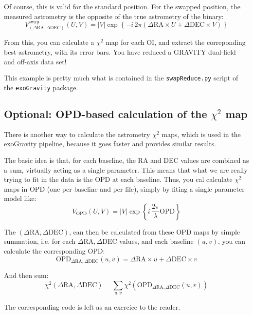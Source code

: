 \noindent{}Of course, this is valid for the standard position. For the swapped position, the measured astrometry is the opposite of the true astrometry of the binary:
\begin{equation*}
  V^{\mathrm{swap}}_{(\Delta{}\mathrm{RA}, \Delta{}\mathrm{DEC})}(U, V) = |V|\exp\left\{{-i\,2\pi}\left(\Delta\mathrm{RA}\times{}U+\Delta\mathrm{DEC}\times{}V\right)\right\}
\end{equation*}

From this, you can calculate a $\chi^2$ map for each OI, and extract the correponding best astrometry, with its error bars. You have reduced a GRAVITY dual-field and off-axis data set!

This example is pretty much what is contained in the \verb|swapReduce.py| script of the \verb|exoGravity| package.

\subsection{Optional: OPD-based calculation of the $\chi^2$ map}

There is another way to calculate the astrometry $\chi^2$ maps, which is used in the exoGravity pipeline, because it goes faster and provides similar results.

The basic idea is that, for each baseline, the RA and DEC values are combined as a sum, virtually acting as a single parameter. This means that what we are really trying to fit in the data is the OPD at each baseline. Thus, you cal calculate $\chi^2$ maps in OPD (one per baseline and per file), simply by fiting a single parameter model like:
\begin{equation*}
  V_{\mathrm{OPD}}(U, V) = |V|\exp\left\{i\,\frac{2\pi}{\lambda}\mathrm{OPD}\right\}
\end{equation*}

The $(\Delta\mathrm{RA}, \Delta\mathrm{DEC})$, can then be calculated from these OPD maps by simple summation, i.e. for each $\Delta\mathrm{RA}, \Delta\mathrm{DEC}$ values, and each baseline $(u, v)$, you can calculate the corresponding OPD:
\begin{equation*}
  \mathrm{OPD}_{\Delta\mathrm{RA}, \Delta\mathrm{DEC}}(u, v) = \Delta\mathrm{RA}\times{}u+\Delta\mathrm{DEC}\times{}v
\end{equation*}

\noindent{}And then sum:
\begin{equation*}
  \chi^2(\Delta{}\mathrm{RA}, \Delta{}\mathrm{DEC}) = \sum_{u, v} \chi^2\left(\mathrm{OPD}_{\Delta\mathrm{RA}, \Delta\mathrm{DEC}}(u, v)\right)
\end{equation*}

\noindent{}The corresponding code is left as an exercice to the reader.
